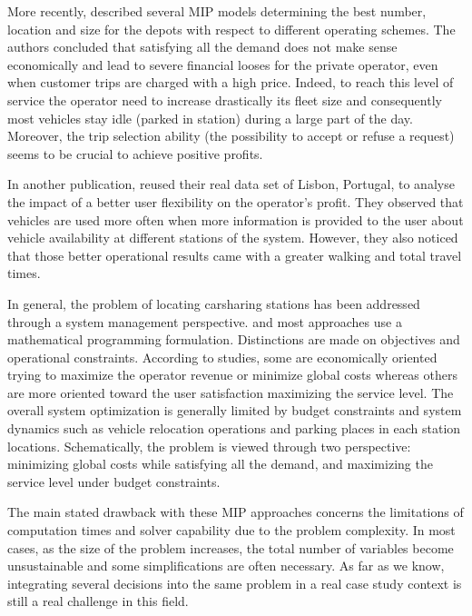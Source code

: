 \begin{bibunit}[ieeetr]
\medskip
More recently, \cite{correia_optimization_2012} described several MIP models determining the best number, location and size for the depots with respect to different operating schemes.
The authors concluded that satisfying all the demand does not make sense economically and lead to severe financial looses for the private operator, even when customer trips are charged with a high price.
Indeed, to reach this level of service the operator need to increase drastically its fleet size and consequently most vehicles stay idle (parked in station) during a large part of the day.
Moreover, the trip selection ability (\ie the possibility to accept or refuse a request) seems to be crucial to achieve positive profits.

In another publication, \cite{correia_added_2014} reused their real data set of Lisbon, Portugal, to analyse the impact of a better user flexibility on the operator's profit.
They observed that vehicles are used more often when more information is provided to the user about vehicle availability at different stations of the system.
However, they also noticed that those better operational results came with a greater walking and total travel times.


\medskip
In general, the problem of locating carsharing stations has been addressed through a system management perspective.
and most approaches use a mathematical programming formulation.
Distinctions are made on objectives and operational constraints.
According to studies, some are economically oriented trying to maximize the operator revenue or minimize global costs whereas others are more oriented toward the user satisfaction maximizing the service level.
The overall system optimization is generally limited by budget constraints and system dynamics such as vehicle relocation operations and parking places in each station locations.
Schematically, the problem is viewed through two perspective: minimizing global costs while satisfying all the demand, and maximizing the service level under budget constraints.

\medskip
The main stated drawback with these MIP approaches concerns the limitations of computation times and solver capability due to the problem complexity.
In most cases, as the size of the problem increases, the total number of variables become unsustainable and some simplifications are often necessary.
As far as we know, integrating several decisions into the same problem in a real case study context is still a real challenge in this field.


\end{bibunit}
